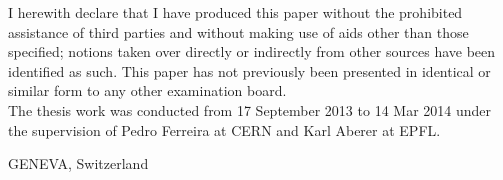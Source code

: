 \begin{declaration}

I herewith declare that I have produced this paper without the prohibited assistance of third parties and without making use of aids other than those specified; notions taken over directly or indirectly from other sources have been identified as such. This paper has not previously been presented in identical or similar form to any other examination board. \\

The thesis work was conducted from 17 September 2013 to 14 Mar 2014 under the supervision of Pedro Ferreira at CERN and Karl Aberer at EPFL.

\vspace{8mm}

GENEVA, Switzerland

\end{declaration}
